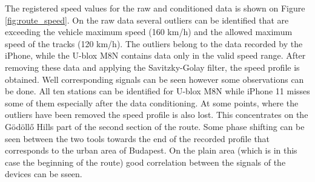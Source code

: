 \documentclass{article}
\begin{document}
			The registered speed values for the raw and conditioned data is shown on Figure \ref{fig:route_speed}. On the raw data several outliers can be identified that are exceeding the vehicle maximum speed (160 km/h) and the allowed maximum speed of the tracks (120 km/h). The outliers belong to the data recorded by the iPhone, while the U-blox M8N contains data only in the valid speed range. After removing these data and applying the Savitzky-Golay filter, the speed profile is obtained. Well corresponding signals can be seen however some observations can be done. All ten stations can be identified for U-blox M8N while iPhone 11 misses some of them especially after the data conditioning. At some points, where the outliers have been removed the speed profile is also lost. This concentrates on the Gödöllő Hills part of the second section of the route. Some phase shifting can be seen between the two tools towards the end of the recorded profile that corresponds to the urban area of Budapest. On the plain area (which is in this case the beginning of the route) good correlation between the signals of the devices can be sseen.
\end{document}
